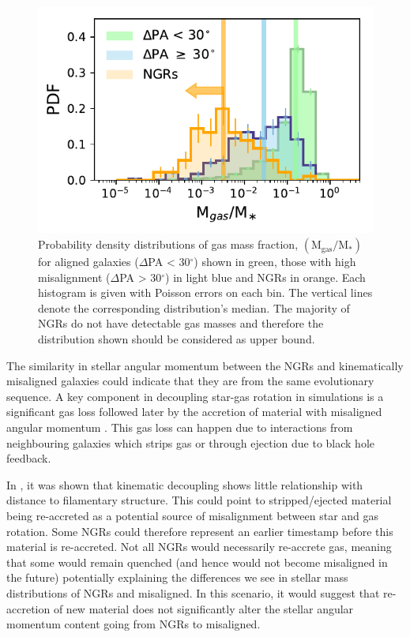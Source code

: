 \begin{figure}
    \centering
	\includegraphics[width=0.8\linewidth]{misalignment_MaNGA/gas_mass_normed_all.pdf}
    \caption{Probability density distributions of gas mass fraction, $\mathrm{(M_{gas}/M_{\ast})}$ for aligned galaxies ($\Delta$PA < 30$^{\circ}$) shown in green, those with high misalignment ($\Delta$PA > 30$^{\circ}$) in light blue and NGRs in orange. Each histogram is given with Poisson errors on each bin. The vertical lines denote the corresponding distribution's median. The majority of NGRs do not have detectable gas masses and therefore the distribution shown should be considered as upper bound.}
    \label{fig:delPA_gasM}
\end{figure}

The similarity in stellar angular momentum between the NGRs and kinematically misaligned galaxies could indicate that they are from the same evolutionary sequence. A key component in decoupling star-gas rotation in simulations is a significant gas loss followed later by the accretion of material with misaligned angular momentum \citep[][]{vdvoort2015, starkenburg+19}. This gas loss can happen due to interactions from neighbouring galaxies which strips gas or through ejection due to black hole feedback.

In  \citet{duckworth2019a}, it was shown that kinematic decoupling shows little relationship with distance to filamentary structure. This could point to stripped/ejected material being re-accreted as a potential source of misalignment between star and gas rotation. Some NGRs could therefore represent an earlier timestamp before this material is re-accreted. Not all NGRs would necessarily re-accrete gas, meaning that some would remain quenched (and hence would not become misaligned in the future) potentially explaining the differences we see in stellar mass distributions of NGRs and misaligned. In this scenario, it would suggest that re-accretion of new material does not significantly alter the stellar angular momentum content going from NGRs to misaligned.

